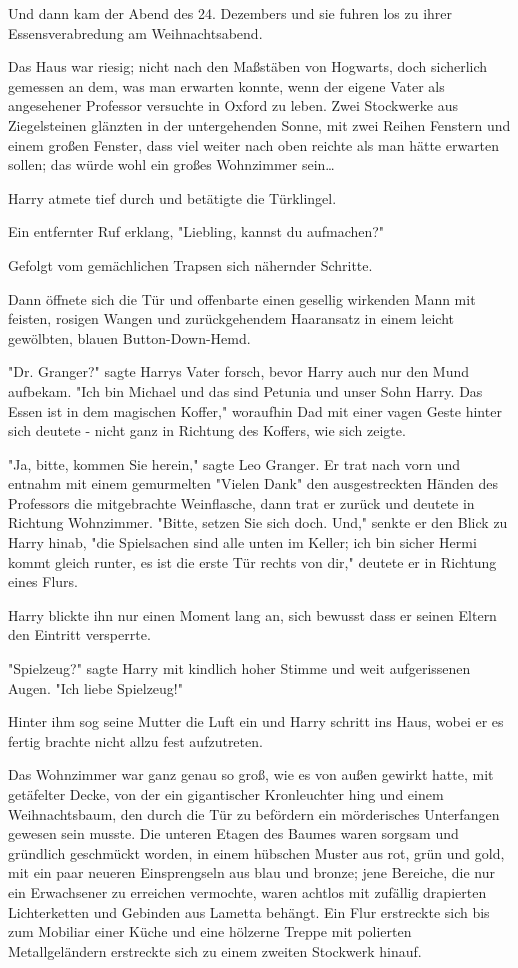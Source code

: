 {Und dann kam der Abend des 24. Dezembers und sie fuhren los zu ihrer Essensverabredung am Weihnachtsabend.

\later

Das Haus war riesig; nicht nach den Maßstäben von Hogwarts, doch sicherlich gemessen an dem, was man erwarten konnte, wenn der eigene Vater als angesehener Professor versuchte in Oxford zu leben. Zwei Stockwerke aus Ziegelsteinen glänzten in der untergehenden Sonne, mit zwei Reihen Fenstern und einem großen Fenster, dass viel weiter nach oben reichte als man hätte erwarten sollen; das würde wohl ein großes Wohnzimmer sein…

Harry atmete tief durch und betätigte die Türklingel.

Ein entfernter Ruf erklang, "Liebling, kannst du aufmachen?"

Gefolgt vom gemächlichen Trapsen sich nähernder Schritte.

Dann öffnete sich die Tür und offenbarte einen gesellig wirkenden Mann mit feisten, rosigen Wangen und zurückgehendem Haaransatz in einem leicht gewölbten, blauen Button-Down-Hemd.

"Dr. Granger?" sagte Harrys Vater forsch, bevor Harry auch nur den Mund aufbekam. "Ich bin Michael und das sind Petunia und unser Sohn Harry. Das Essen ist in dem magischen Koffer," woraufhin Dad mit einer vagen Geste hinter sich deutete - nicht ganz in Richtung des Koffers, wie sich zeigte.

"Ja, bitte, kommen Sie herein," sagte Leo Granger. Er trat nach vorn und entnahm mit einem gemurmelten "Vielen Dank" den ausgestreckten Händen des Professors die mitgebrachte Weinflasche, dann trat er zurück und deutete in Richtung Wohnzimmer. "Bitte, setzen Sie sich doch. Und," senkte er den Blick zu Harry hinab, "die Spielsachen sind alle unten im Keller; ich bin sicher Hermi kommt gleich runter, es ist die erste Tür rechts von dir," deutete er in Richtung eines Flurs.

Harry blickte ihn nur einen Moment lang an, sich bewusst dass er seinen Eltern den Eintritt versperrte.

"Spielzeug?" sagte Harry mit kindlich hoher Stimme und weit aufgerissenen Augen. "Ich liebe Spielzeug!"

Hinter ihm sog seine Mutter die Luft ein und Harry schritt ins Haus, wobei er es fertig brachte nicht allzu fest aufzutreten.

Das Wohnzimmer war ganz genau so groß, wie es von außen gewirkt hatte, mit getäfelter Decke, von der ein gigantischer Kronleuchter hing und einem Weihnachtsbaum, den durch die Tür zu befördern ein mörderisches Unterfangen gewesen sein musste. Die unteren Etagen des Baumes waren sorgsam und gründlich geschmückt worden, in einem hübschen Muster aus rot, grün und gold, mit ein paar neueren Einsprengseln aus blau und bronze; jene Bereiche, die nur ein Erwachsener zu erreichen vermochte, waren achtlos mit zufällig drapierten Lichterketten und Gebinden aus Lametta behängt. Ein Flur erstreckte sich bis zum Mobiliar einer Küche und eine hölzerne Treppe mit polierten Metallgeländern erstreckte sich zu einem zweiten Stockwerk hinauf.

}

